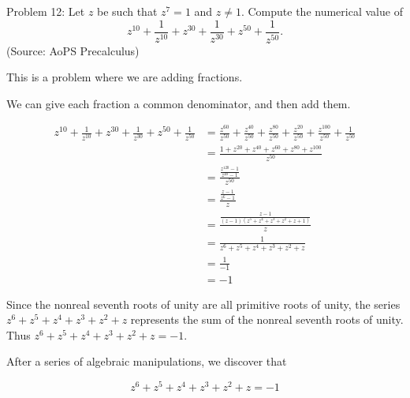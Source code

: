 Problem 12: Let $z$ be such that $z^7 = 1$ and $z \neq 1$. Compute the numerical value of \[z^{10} + \frac{1}{z^{10}} + z^{30} + \frac{1}{z^{30}} + z^{50} + \frac{1}{z^{50}}.\] (Source: AoPS Precalculus)

This is a problem where we are adding fractions. 

We can give each fraction a common denominator, and then add them.

\begin{align*}
z^{10} + \frac{1}{z^{10}} + z^{30} + \frac{1}{z^{30}} + z^{50} + \frac{1}{z^{50}}
&= \frac{z^{60}}{z^{50}} + \frac{z^{40}}{z^{50}} + \frac{z^{80}}{z^{50}} + \frac{z^{20}}{z^{50}} + \frac{z^{100}}{z^{50}} + \frac{1}{z^{50}} \\
&= \frac{1 + z^{20} + z^{40} + z^{60} + z^{80} + z^{100}}{z^{50}} \\
&= \frac{\frac{z^{120} - 1}{z^{20} - 1}}{z^{50}} \\
&= \frac{\frac{z - 1}{z^{6} - 1}}{z} \\
&= \frac{\frac{z - 1}{(z - 1)(z^5 + z^4 + z^3 + z^2 + z + 1)}}{z} \\
&= \frac{1}{z^6 + z^5 + z^4 + z^3 + z^2 + z} \\
&= \frac{1}{-1} \\
&= \boxed{-1}
\end{align*}

Since the nonreal seventh roots of unity are all primitive roots of unity, the series $z^6 + z^5 + z^4 + z^3 + z^2 + z$ represents the sum of the nonreal seventh roots of unity. Thus $z^6 + z^5 + z^4 + z^3 + z^2 + z = -1$.

After a series of algebraic manipulations, we discover that

$$ \boxed{z^6 + z^5 + z^4 + z^3 + z^2 + z = -1} $$
